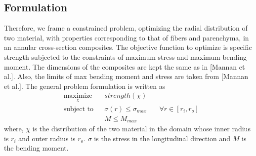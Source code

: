 \documentclass[10pt]{article}
\begin{document}
\subsection{Formulation}
Therefore, we frame a constrained problem, optimizing the radial distribution of two material, with properties corresponding to that of fibers and parenchyma, in an annular cross-section composites. The objective function to optimize is specific strength subjected to the constraints of maximum stress and maximum bending moment. The dimensions of the composites are kept the same as in [Mannan et al.]. Also, the limits of max bending moment and stress are taken from [Mannan et al.]. The general problem formulation is written as
\begin{equation*}
\begin{aligned}
& \underset{\chi}{\text{maximize}}
& & strength(\chi) \\
& \text{subject to}
& & \sigma(r) \leq \sigma_{max} &\quad \forall r \in [r_i, r_o]\\
& & & M \leq M_{max}
\end{aligned}
\end{equation*}
where, $\chi$ is the distribution of the two material in the domain whose inner radius is $r_i$ and outer radius is $r_o$.  $\sigma$ is the stress in the longitudinal direction and $M$ is the bending moment. \par
\end{document}
